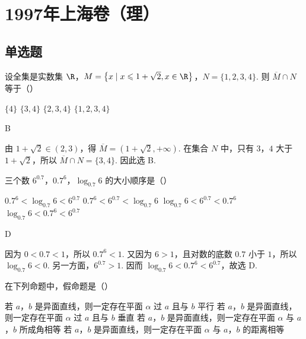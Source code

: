 \chapter{1997年上海卷（理）}
\section{单选题}

\begin{problem}
设全集是实数集 \(\R\)，\(M=\left\{x \mid x \leqslant 1+\sqrt{2}, x \in \R\right\}\)，\(N=\{1,2,3,4\}\). 则 \(\overline{M} \cap N\) 等于（\quad）

\choices
    {\(\{4\}\)}
    {\(\{3,4\}\)}
    {\(\{2,3,4\}\)}
    {\(\{1,2,3,4\}\)}
\end{problem}

\begin{answer}
B
\end{answer}

\begin{solution}
由 \(1+\sqrt{2}\in(2,3)\)，得 \(\overline{M}=(1+\sqrt{2},+\infty)\). 在集合 \(N\) 中，只有 \(3\)，\(4\) 大于 \(1+\sqrt{2}\)，所以 \(\overline{M}\cap N=\{3,4\}\). 因此选 B.
\end{solution}

\begin{problem}
三个数 \(6^{0.7}\)，\(0.7^{6}\)，\(\log_{0.7}6\) 的大小顺序是（\quad）

\choices
    {\(0.7^6 < \log_{0.7}6 < 6^{0.7}\)}
    {\(0.7^6 < 6^{0.7} < \log_{0.7}6\)}
    {\(\log_{0.7}6 < 6^{0.7} < 0.7^6\)}
    {\(\log_{0.7}6 < 0.7^6 < 6^{0.7}\)}
\end{problem}

\begin{answer}
D
\end{answer}

\begin{solution}
因为 \(0<0.7<1\)，所以 \(0.7^6<1\). 又因为 \(6>1\)，且对数的底数 \(0.7\) 小于 \(1\)，所以 \(\log_{0.7}6<0\). 另一方面，\(6^{0.7}>1\). 因而
\(\log_{0.7}6<0.7^6<6^{0.7}\)，故选 D.
\end{solution}

\begin{problem}
在下列命题中，假命题是（\quad）

\choices
    {若 \(a\)，\(b\) 是异面直线，则一定存在平面 \(\alpha\) 过 \(a\) 且与 \(b\) 平行}
    {若 \(a\)，\(b\) 是异面直线，则一定存在平面 \(\alpha\) 过 \(a\) 且与 \(b\) 垂直}
    {若 \(a\)，\(b\) 是异面直线，则一定存在平面 \(\alpha\) 与 \(a\)，\(b\) 所成角相等}
    {若 \(a\)，\(b\) 是异面直线，则一定存在平面 \(\alpha\) 与 \(a\)，\(b\) 的距离相等}
\end{problem}

